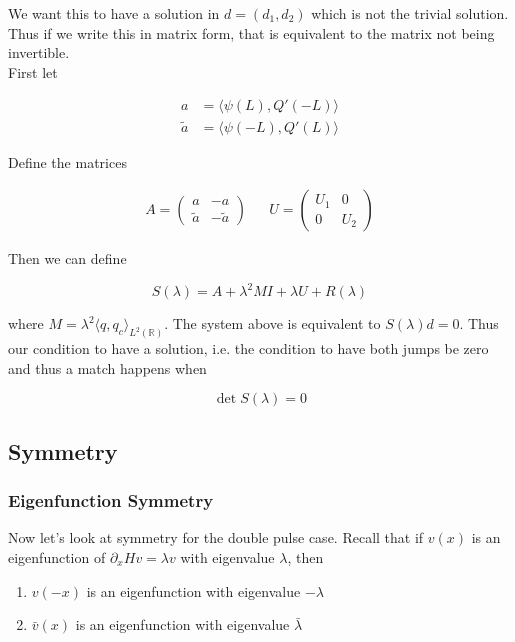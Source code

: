 \documentclass[12pt]{article}
\def\R{{\mathbb R}}
\begin{document}
We want this to have a solution in $d = (d_1, d_2)$ which is not the trivial solution. Thus if we write this in matrix form, that is equivalent to the matrix not being invertible.\\

First let

\begin{align*}
a &= \langle \psi(L), Q'(-L) \rangle \\
\tilde{a} &=\langle \psi(-L), Q'(L) \rangle
\end{align*}

Define the matrices

\begin{align*}
A = \begin{pmatrix}
a & -a \\ \tilde{a} & -\tilde{a} 
\end{pmatrix} &&
U = \begin{pmatrix}
U_1 & 0 \\ 0 & U_2 
\end{pmatrix} 
\end{align*}

Then we can define

\[
S(\lambda) = A + \lambda^2 MI + \lambda U + R(\lambda) 
\]

where $M = \lambda^2 \langle q, q_c \rangle_{L^2(\R)}$. The system above is equivalent to $S(\lambda)d = 0$. Thus our condition to have a solution, i.e. the condition to have both jumps be zero and thus a match happens when

\[
\det S(\lambda) = 0
\]

\subsection*{Symmetry}

\subsubsection*{Eigenfunction Symmetry}

Now let's look at symmetry for the double pulse case. Recall that if $v(x)$ is an eigenfunction of $\partial_x H v = \lambda v$ with eigenvalue $\lambda$, then

\begin{enumerate}
	\item $v(-x)$ is an eigenfunction with eigenvalue $-\lambda$
	\item $\bar{v}(x)$ is an eigenfunction with eigenvalue $\bar{\lambda}$
\end{enumerate}
\end{document}
